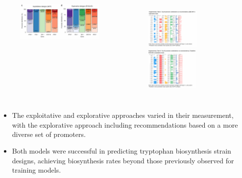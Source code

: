 \documentclass{beamer}
\begin{document}
\begin{frame}{}
		\begin{columns}
	    \begin{figure}
		\flushleft
		\includegraphics[width=5.3cm]{pic/图片25.pdf}
 	    \end{figure}
	    \begin{figure}
		\flushleft
		\includegraphics[width=2.6cm]{pic/图片27.pdf}
		\includegraphics[width=2.6cm]{pic/图片28.pdf}
 	    \end{figure}
        \end{columns}
    \begin{itemize} [<+-| alert@+>] %
        \item\scriptsize The exploitative and explorative approaches varied in their measurement, with the explorative approach including recommendations based on a more diverse set of promoters. 
        \item\scriptsize Both models were successful in predicting tryptophan biosynthesis strain designs, achieving biosynthesis rates beyond those previously observed for training models.    
    \end{itemize} 
\end{frame}




\end{document}
